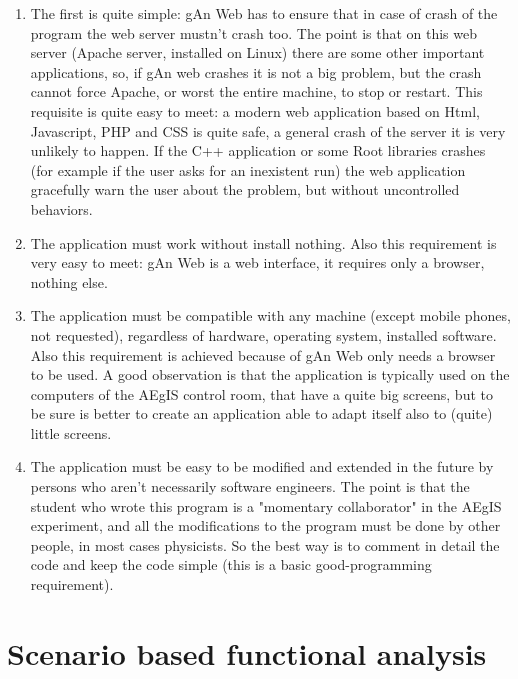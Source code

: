 \begin{enumerate}

\item The first is quite simple: gAn Web has to ensure that in case of crash of the program the web server mustn't crash too. The point is that on this web server (Apache server, installed on Linux) there are some other important applications, so, if gAn web crashes it is not a big problem, but the crash cannot force Apache, or worst the entire machine, to stop or restart. 
This requisite is quite easy to meet: a modern web application based on Html, Javascript, PHP and CSS is quite safe, a general crash of the server it is very unlikely to happen. If the C++ application or some Root libraries crashes (for example if the user asks for an inexistent run) the web application gracefully warn the user about the problem, but without uncontrolled behaviors.  

\item The application must work without install nothing. Also this requirement is very easy to meet: gAn Web is a web interface, it requires only a browser, nothing else.

\item The application must be compatible with any machine (except mobile phones, not requested), regardless of hardware, operating system, installed software. Also this requirement is achieved because of gAn Web only needs a browser to be used. A good observation is that the application is typically used on the computers of the AEgIS control room, that have a quite big screens, but to be sure is better to create an application able to adapt itself also to (quite) little screens.  

\item The application must be easy to be modified and extended in the future by persons who aren't necessarily software engineers. The point is that the student who wrote this program is a "momentary collaborator" in the AEgIS experiment, and all the modifications to the program must be done by other people, in most cases physicists. So the best way is to comment in detail the code and keep the code simple (this is a basic good-programming requirement).   


\end{enumerate}

\section{Scenario based functional analysis}

